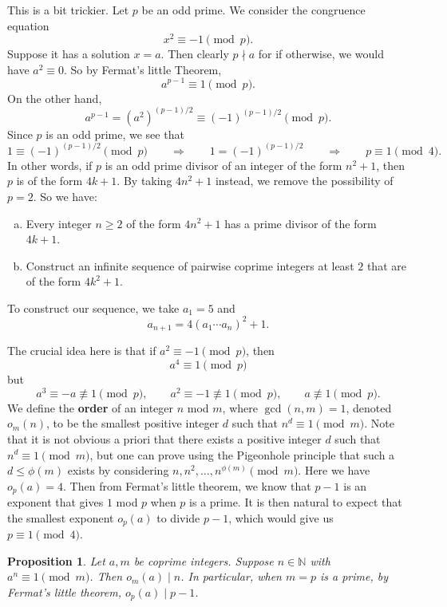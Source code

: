 \documentclass{article}
\def\N{{\mathbb N}}
\newtheorem{proposition}[subsection]{Proposition}
\begin{document}
This is a bit trickier. Let $p$ be an odd prime. We consider the congruence equation $$x^2\equiv -1\pmod{p}.$$
Suppose it has a solution $x = a$. Then clearly $p\nmid a$ for if otherwise, we would have $a^2\equiv 0$. So by Fermat's little Theorem, $$a^{p-1}\equiv 1\pmod{p}.$$
On the other hand, $$a^{p-1} = (a^2)^{(p-1)/2} \equiv (-1)^{(p-1)/2}\pmod{p}.$$
Since $p$ is an odd prime, we see that $$1\equiv(-1)^{(p-1)/2}\pmod{p} \qquad\Rightarrow\qquad 1 = (-1)^{(p-1)/2} \qquad\Rightarrow\qquad p\equiv 1\pmod{4}.$$
In other words, if $p$ is an odd prime divisor of an integer of the form $n^2 + 1$, then $p$ is of the form $4k+1$. By taking $4n^2 + 1$ instead, we remove the possibility of $p=2$. So we have:
\begin{enumerate}[(a)]
    \item Every integer $n\geq2$ of the form $4n^2+1$ has a prime divisor of the form $4k+1$.
    \item Construct an infinite sequence of pairwise coprime integers at least $2$ that are of the form $4k^2+1$.
\end{enumerate}
To construct our sequence, we take $a_1 = 5$ and
$$a_{n+1} = 4(a_1\cdots a_n)^2 + 1.$$


\vspace{5pt}
The crucial idea here is that if $a^2\equiv -1\pmod{p}$, then 
$$a^4\equiv 1\pmod{p}$$
but
$$a^3\equiv -a\not\equiv 1\pmod{p},\qquad a^2\equiv -1\not\equiv 1\pmod{p},\qquad a\not\equiv 1\pmod{p}.$$
We define the \textbf{order} of an integer $n$ mod $m$, where $\gcd(n,m) = 1$, denoted $o_m(n)$, to be the smallest positive integer $d$ such that $n^d \equiv 1\pmod{m}.$ Note that it is not obvious a priori that there exists a positive integer $d$ such that $n^d\equiv 1\pmod{m}$, but one can prove using the Pigeonhole principle that such a $d\leq\phi(m)$ exists by considering $n, n^2,\ldots, n^{\phi(m)}\pmod{m}$. Here we have $o_p(a) = 4$. Then from Fermat's little theorem, we know that $p-1$ is an exponent that gives $1$ mod $p$ when $p$ is a prime. It is then natural to expect that the smallest exponent $o_p(a)$ to divide $p-1$, which would give us $p\equiv 1\pmod{4}$.




\begin{proposition}\label{prop:lag}
    Let $a,m$ be coprime integers. Suppose $n\in\N$ with $a^n\equiv 1\pmod{m}$. Then $o_m(a)\mid n$. In particular, when $m = p$ is a prime, by Fermat's little theorem, $o_p(a)\mid p-1$.
\end{proposition}
\end{document}
